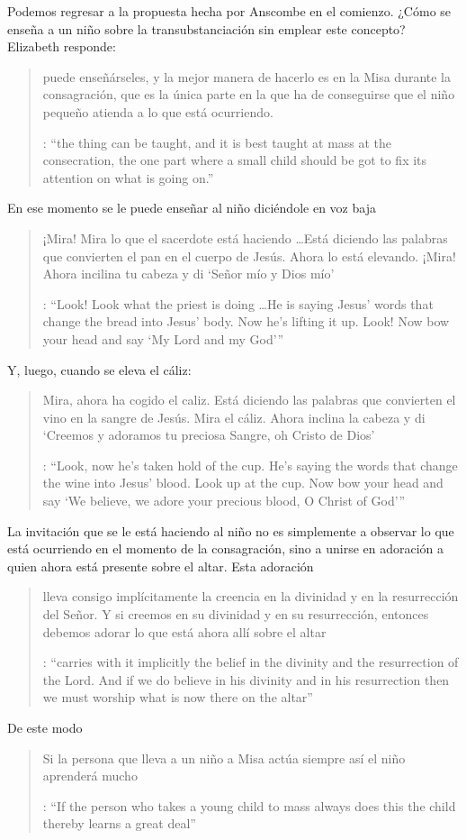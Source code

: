 Podemos regresar a la propuesta hecha por Anscombe en el comienzo. ¿Cómo se enseña a un niño sobre la transubstanciación sin emplear este concepto? Elizabeth responde: \blockquote[{\cite[107]{anscombe1981erp:ot}}: \enquote{the thing can be taught, and it is best taught at mass at the consecration, the one part where a small child should be got to fix its attention on what is going on.}]{puede enseñárseles, y la mejor manera de hacerlo es en la Misa durante la consagración, que es la única parte en la que ha de conseguirse que el niño pequeño atienda a lo que está ocurriendo.} En ese momento se le puede enseñar al niño diciéndole en voz baja \blockquote[{\cite[107]{anscombe1981erp:ot}}: \enquote{Look! Look what the priest is doing \ldots He is saying Jesus' words that change the bread into Jesus' body. Now he's lifting it up. Look! Now bow your head and say `My Lord and my God'}]{¡Mira! Mira lo que el sacerdote está haciendo \ldots Está diciendo las palabras que convierten el pan en el cuerpo de Jesús. Ahora lo está elevando. ¡Mira! Ahora incilina tu cabeza y di `Señor mío y Dios mío'}. Y, luego, cuando se eleva el cáliz: \blockquote[{\cite[107]{anscombe1981erp:ot}}: \enquote{Look, now he's taken hold of the cup. He's saying the words that change the wine into Jesus' blood. Look up at the cup. Now bow your head and say `We believe, we adore your precious blood, O Christ of God'}]{Mira, ahora ha cogido el caliz. Está diciendo las palabras que convierten el vino en la sangre de Jesús. Mira el cáliz. Ahora inclina la cabeza y di `Creemos y adoramos tu preciosa Sangre, oh Cristo de Dios'}.

La invitación que se le está haciendo al niño no es simplemente a observar lo que está ocurriendo en el momento de la consagración, sino a unirse en adoración a quien ahora está presente sobre el altar. Esta adoración \blockquote[{\cite[107]{anscombe1981erp:ot}}: \enquote{carries with it implicitly the belief in the divinity and the resurrection of the Lord. And if we do believe in his divinity and in his resurrection then we must worship what is now there on the altar}]{lleva consigo implícitamente la creencia en la divinidad y en la resurrección del Señor. Y si creemos en su divinidad y en su resurrección, entonces debemos adorar lo que está ahora allí sobre el altar}. De este modo \blockquote[{\cite[107]{anscombe1981erp:ot}}: \enquote{If the person who takes a young child to mass always does this \textelp{} the child thereby learns a great deal}]{Si la persona que lleva a un niño a Misa actúa siempre así \textelp{} el niño aprenderá mucho}.

